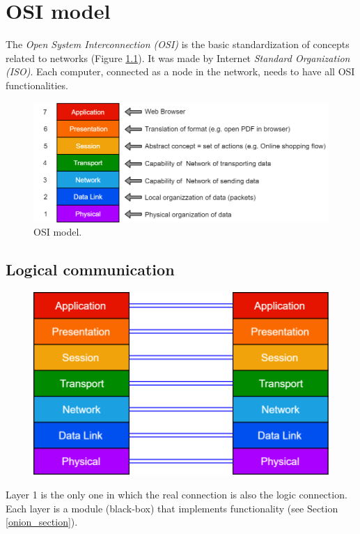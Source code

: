 \chapter{OSI model}
The \textit{Open System Interconnection (OSI)} is the basic standardization of concepts related to networks (Figure \ref{OSI}). It was made by Internet \textit{Standard Organization (ISO)}. Each computer, connected as a node in the network, needs to have all OSI functionalities.
\begin{figure}[h]
\centering
\includegraphics[scale=0.4]{Images/OSI/osi}\caption{\footnotesize{OSI model.}}\label{OSI}
\end{figure}

\section{Logical communication}
\begin{figure}[h]
\centering
\includegraphics[scale=0.3]{Images/OSI/logic}
\end{figure}
Layer 1 is the only one in which the real connection is also the logic connection. Each layer is a module (black-box) that implements functionality (see Section \ref{onion_section}).

